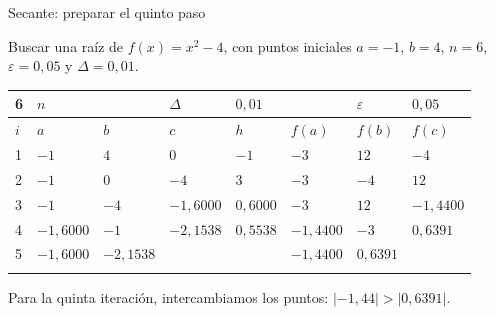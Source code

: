 \documentclass[main.tex]{subfiles}
\begin{document}
\begin{frame}[t]{Secante: preparar el quinto paso}
\begin{minipage}[t][13mm][t]{\textwidth}\small Buscar una raíz de $f(x)=x^2-4$, con puntos iniciales $a=-1$, $b=4$, $n=6$, $\varepsilon=0{,}05$ y $\Delta=0{,}01$.\end{minipage}\par{\scriptsize\setlength{\tabcolsep}{2pt}\renewcommand{\arraystretch}{1}\begin{center}\begin{tabular}{|C{.04\textwidth}|C{.112\textwidth}|C{.112\textwidth}|C{.112\textwidth}|C{.112\textwidth}|C{.112\textwidth}|C{.112\textwidth}|C{.112\textwidth}|}
\hline
\rule{0pt}{4.3mm}6 & $n$ &  &  $\Delta$  & $0{,}01$ &  & $\varepsilon$ & $0{,}05$\\\hline
\rule{0pt}{4.3mm}$i$ & $a$ & $b$ & $c$ & $h$ & $f(a)$ & $f(b)$ & $f(c)$\\\hline
\rule{0pt}{4.3mm}1 & $-1$ & $4$ & $0$ & $-1$ & $-3$ & $12$ & $-4$\\\hline
\rule{0pt}{4.3mm}2 & $-1$ & $0$ & $-4$ & $3$ & $-3$ & $-4$ & $12$\\\hline
\rule{0pt}{4.3mm}3 & $-1$ & $-4$ & $-1{,}6000$ & $0{,}6000$ & $-3$ & $12$ & $-1{,}4400$\\\hline
\rule{0pt}{4.3mm}4 & $-1{,}6000$ & $-1$ & $-2{,}1538$ & $0{,}5538$ & $-1{,}4400$ & $-3$ & $0{,}6391$\\\hline
\rule{0pt}{4.3mm}5 & $-1{,}6000$ & $-2{,}1538$ &  &  & $-1{,}4400$ & $0{,}6391$ & \\\hline
\rule{0pt}{4.3mm} &  &  &  &  &  &  & \\\hline
\end{tabular}\end{center}}\begin{minipage}[t][10mm][t]{\textwidth}\footnotesize Para la quinta iteración, intercambiamos los puntos: $|-1{,}44|>|0{,}6391|$.\end{minipage}
\end{frame}
\end{document}
